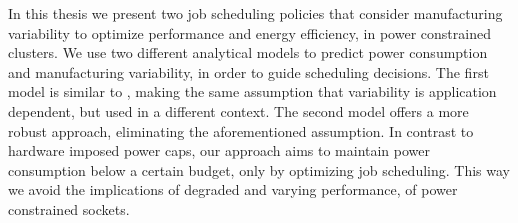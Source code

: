 In this thesis we present two job scheduling policies that consider
manufacturing variability to optimize performance and energy efficiency, in
power constrained clusters.  We use two different analytical models to predict
power consumption and manufacturing variability, in order to guide scheduling
decisions.  The first model is similar to
\cite{Inadomi:2015:AMI:2807591.2807638}, making the same assumption that
variability is application dependent, but used in a different context.  The
second model offers a more robust approach, eliminating the aforementioned
assumption.  In contrast to hardware imposed power caps, our approach aims to
maintain power consumption below a certain budget, only by optimizing job
scheduling.  This way we avoid the implications of degraded and varying
performance, of power constrained sockets.


